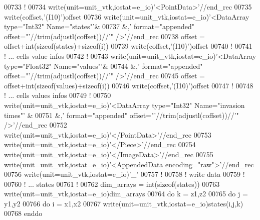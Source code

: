 \begin{DoxyCode}
00733 \textcolor{comment}{!}
00734 \textcolor{keyword}{write}(unit=unit\_vtk,iostat=e\_io)\textcolor{stringliteral}{'<PointData>'}//end\_rec
00735 \textcolor{keyword}{write}(coffset,\textcolor{stringliteral}{'(I10)'})offset
00736 \textcolor{keyword}{write}(unit=unit\_vtk,iostat=e\_io)\textcolor{stringliteral}{'<DataArray type="Int32" Name="states"'}&
00737 &,\textcolor{stringliteral}{' format="appended" offset="'}//trim(adjustl(coffset))//\textcolor{stringliteral}{'" />'}//end\_rec
00738 offset = offset+int(sizeof(states)+sizeof(i))
00739 \textcolor{keyword}{write}(coffset,\textcolor{stringliteral}{'(I10)'})offset
00740 \textcolor{comment}{!}
00741 \textcolor{comment}{! ... cells value infos}
00742 \textcolor{comment}{!}
00743 \textcolor{keyword}{write}(unit=unit\_vtk,iostat=e\_io)\textcolor{stringliteral}{'<DataArray type="Float32" Name="values"'}&
00744 &,\textcolor{stringliteral}{' format="appended" offset="'}//trim(adjustl(coffset))//\textcolor{stringliteral}{'" />'}//end\_rec
00745 offset = offset+int(sizeof(values)+sizeof(i))
00746 \textcolor{keyword}{write}(coffset,\textcolor{stringliteral}{'(I10)'})offset
00747 \textcolor{comment}{!}
00748 \textcolor{comment}{! ... cells values infos}
00749 \textcolor{comment}{!}
00750 \textcolor{keyword}{write}(unit=unit\_vtk,iostat=e\_io)\textcolor{stringliteral}{'<DataArray type="Int32" Name="invasion times"'}
      &
00751 &,\textcolor{stringliteral}{' format="appended" offset="'}//trim(adjustl(coffset))//\textcolor{stringliteral}{'" />'}//end\_rec
00752 \textcolor{keyword}{write}(unit=unit\_vtk,iostat=e\_io)\textcolor{stringliteral}{'</PointData>'}//end\_rec
00753 \textcolor{keyword}{write}(unit=unit\_vtk,iostat=e\_io)\textcolor{stringliteral}{'</Piece>'}//end\_rec
00754 \textcolor{keyword}{write}(unit=unit\_vtk,iostat=e\_io)\textcolor{stringliteral}{'</ImageData>'}//end\_rec
00755 \textcolor{keyword}{write}(unit=unit\_vtk,iostat=e\_io)\textcolor{stringliteral}{'<AppendedData encoding="raw">'}//end\_rec
00756 \textcolor{keyword}{write}(unit=unit\_vtk,iostat=e\_io)\textcolor{stringliteral}{'\_'}
00757 \textcolor{comment}{!}
00758 \textcolor{comment}{! write data }
00759 \textcolor{comment}{!}
00760 \textcolor{comment}{! ... states}
00761 \textcolor{comment}{!}
00762 dim\_arrays = int(sizeof(states))
00763 \textcolor{keyword}{write}(unit=unit\_vtk,iostat=e\_io)dim\_arrays
00764 \textcolor{keyword}{do} k = z1,z2
00765    \textcolor{keyword}{do} j = y1,y2
00766       \textcolor{keyword}{do} i = x1,x2
00767          \textcolor{keyword}{write}(unit=unit\_vtk,iostat=e\_io)states(i,j,k)
00768       \textcolor{keyword}{enddo}

\end{DoxyCode}
